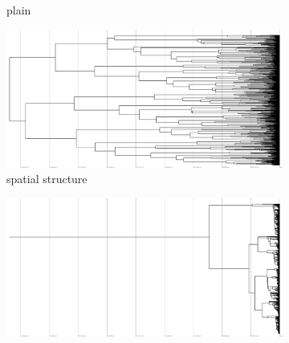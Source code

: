 \begin{figure}
\begin{subfigure}[b]{0.5\columnwidth}
    \caption{%
      plain}
  \end{subfigure}
  \hfill
  \begin{subfigure}[b]{0.5\columnwidth}
    \includegraphics[height=0.12\textheight,width=\textwidth]{img/perfect-tree-phylogenies-log/epoch=7+resolution=3+treatment=6.pdf}
    \caption{%
      spatial structure}
  \end{subfigure}
  \hfill
  \begin{subfigure}[b]{0.5\columnwidth}
    \includegraphics[height=0.12\textheight,width=\textwidth]{img/perfect-tree-phylogenies-log/epoch=7+resolution=3+treatment=26.pdf}

\end{subfigure}
\end{figure}
